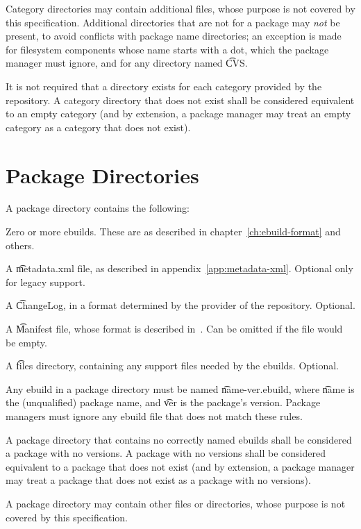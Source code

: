 Category directories may contain additional files, whose purpose is not covered by this
specification. Additional directories that are not for a package may \emph{not} be present, to avoid
conflicts with package name directories; an exception is made for filesystem components whose name
starts with a dot, which the package manager must ignore, and for any directory named \t{CVS}.

It is not required that a directory exists for each category provided by the repository. A category
directory that does not exist shall be considered equivalent to an empty category (and by extension,
a package manager may treat an empty category as a category that does not exist).

\section{Package Directories}
\label{sec:package-dirs}

A package directory contains the following:
\nobreakpar
\begin{compactitem}
\item Zero or more ebuilds. These are as described in chapter~\ref{ch:ebuild-format} and others.
\item A \t{metadata.xml} file, as described in appendix~\ref{app:metadata-xml}\@. Optional only for
    legacy support.
\item A \t{ChangeLog}, in a format determined by the provider of the repository. Optional.
\item A \t{Manifest} file, whose format is described in~\cite{glep74}. Can be omitted if the file
    would be empty.
\item A \t{files} directory, containing any support files needed by the ebuilds. Optional.
\end{compactitem}

Any ebuild in a package directory must be named \t{name-ver.ebuild}, where \t{name} is the
(unqualified) package name, and \t{ver} is the package's version. Package managers must ignore
any ebuild file that does not match these rules.

A package directory that contains no correctly named ebuilds shall be considered a package with no
versions. A package with no versions shall be considered equivalent to a package that does not
exist (and by extension, a package manager may treat a package that does not exist as a package
with no versions).

A package directory may contain other files or directories, whose purpose is not covered by
this specification.

